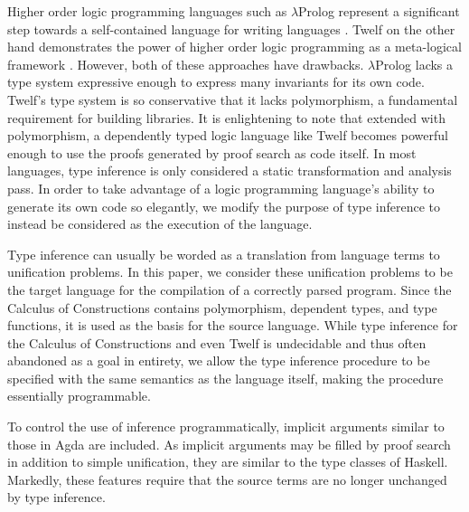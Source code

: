 Higher order logic programming languages such as $\lambda$Prolog represent a significant
step towards a self-contained language for writing languages \citep{miller1988overview}. 
Twelf on the other hand
demonstrates the power of higher order logic programming as a meta-logical framework
\citep{pfenning1999system}. However, both of these approaches have drawbacks. $\lambda$Prolog lacks a type system expressive enough to express many invariants for its own code. Twelf’s type system
is so conservative that it lacks polymorphism, a fundamental requirement for building
libraries. It is enlightening to note that extended with polymorphism, a dependently
typed logic language like Twelf becomes powerful enough to use the proofs generated
by proof search as code itself. In most languages, type inference is only considered a
static transformation and analysis pass. In order to take advantage of a logic programming language’s ability to generate its own code so elegantly, we modify the purpose of type
inference to instead be considered as the execution of the language.


Type inference can usually be worded as a translation from language terms to unification
problems. In this paper, we consider these unification problems to be the target
language for the compilation of a correctly parsed program. Since the Calculus of Constructions
\citep{coquand1986calculus} contains polymorphism, dependent types, and type functions, it is used
as the basis for the source language. While type inference for the Calculus of Constructions and even Twelf is undecidable\citep{Dowek93tlca} and thus often abandoned as a goal in entirety, we allow the
type inference procedure to be specified with the same semantics as the language itself,
making the procedure essentially programmable.

To control the use of inference programmatically, implicit arguments similar to those
in Agda are included. As implicit arguments may be filled by proof search in addition
to simple unification, they are similar to the type classes of Haskell. Markedly, these
features require that the source terms are no longer unchanged by type inference.


